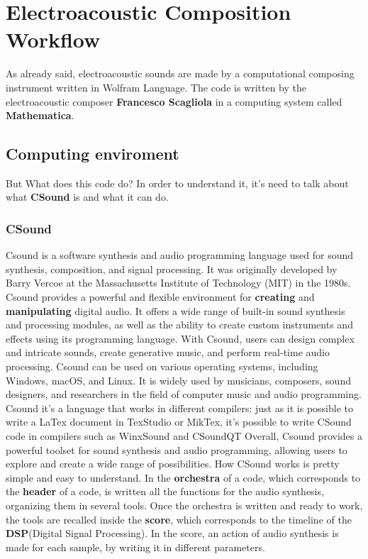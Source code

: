 
\chapter{Electroacoustic Composition Workflow}
\label{chp:fundamentals}

As already said, electroacoustic sounds are made by a computational composing instrument written in Wolfram Language. The code is written by the electroacoustic composer \textbf{Francesco Scagliola} in a computing system called \textbf{Mathematica}.
	
	\section{Computing enviroment}
	But What does this code do?
	In order to understand it, it's need to talk about what \textbf{CSound} is and what it can do.
	
		\subsection{CSound}
		Csound is a software synthesis and audio programming language used for sound synthesis, composition, and signal processing. It was originally developed by Barry Vercoe at the Massachusetts Institute of Technology (MIT) in the 1980s.
		Csound provides a powerful and flexible environment for \textbf{creating} and \textbf{manipulating} digital audio. It offers a wide range of built-in sound synthesis and processing modules, as well as the ability to create custom instruments and effects using its programming language. With Csound, users can design complex and intricate sounds, create generative music, and perform real-time audio processing.
		Csound can be used on various operating systems, including Windows, macOS, and Linux. It is widely used by musicians, composers, sound designers, and researchers in the field of computer music and audio programming.
		Csound it's a language that works in different compilers: just as it is possible to write a LaTex document in TexStudio or MikTex, it's possible to write CSound code in compilers such as WinxSound and CSoundQT
		Overall, Csound provides a powerful toolset for sound synthesis and audio programming, allowing users to explore and create a wide range of possibilities.
		How CSound works is pretty simple and easy to understand. In the \textbf{orchestra} of a code, which corresponds to the \textbf{header} of a code, is written all the functions for the audio synthesis, organizing them in several tools.
		Once the orchestra is written and ready to work, the tools are recalled inside the \textbf{score}, which corresponds to the timeline of the \textbf{DSP}(Digital Signal Processing).
		In the score, an action of audio synthesis is made for each sample, by writing it in different parameters.
		

